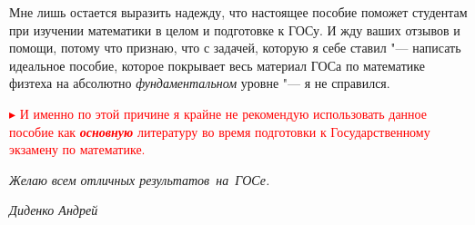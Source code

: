 Мне лишь остается выразить надежду, что настоящее пособие поможет студентам при изучении математики в целом и подготовке к ГОСу. И жду ваших отзывов и помощи, потому что признаю, что с задачей, которую я себе ставил "--- написать идеальное пособие, которое покрывает весь материал ГОСа по математике физтеха на абсолютно \textit{фундаментальном} уровне "--- я не справился.

\textcolor{red}{
$\blacktriangleright$
И именно по этой причине я крайне не рекомендую использовать данное пособие как \textit{\textbf{основную}} литературу во время подготовки к Государственному экзамену по математике.
}

\vspace*{0.7\baselineskip} 

\textit{Желаю всем отличных результатов~на~ГОСе.}

\mbox{}

\noindent\textit{Диденко Андрей}